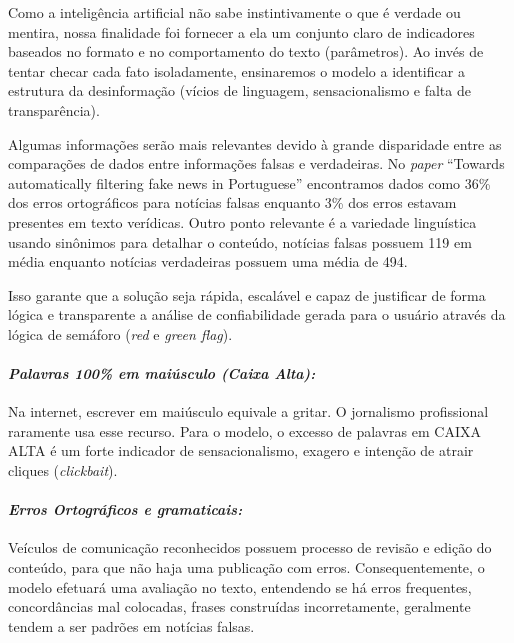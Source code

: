 \documentclass[
  brazilian,
  11pt,
]{article}
\begin{document}
Como a inteligência artificial não sabe instintivamente o que é verdade ou mentira, nossa finalidade foi fornecer a ela um conjunto claro de indicadores baseados no formato e no comportamento do texto (parâmetros). Ao invés de tentar checar cada fato isoladamente, ensinaremos o modelo a identificar a estrutura da desinformação (vícios de linguagem, sensacionalismo e falta de transparência).

Algumas informações serão mais relevantes devido à grande disparidade entre as comparações de dados entre informações falsas e verdadeiras. No \emph{paper} ``Towards automatically filtering fake news in Portuguese'' encontramos dados como 36\% dos erros ortográficos para notícias falsas enquanto 3\% dos erros estavam presentes em texto verídicas. Outro ponto relevante é a variedade linguística usando sinônimos para detalhar o conteúdo, notícias falsas possuem 119 em média enquanto notícias verdadeiras possuem uma média de 494.

Isso garante que a solução seja rápida, escalável e capaz de justificar de forma lógica e transparente a análise de confiabilidade gerada para o usuário através da lógica de semáforo (\emph{red} e \emph{green flag}).

\paragraph{\texorpdfstring{\emph{Palavras 100\% em maiúsculo (Caixa Alta):}}{Palavras 100\% em maiúsculo (Caixa Alta):}}\label{palavras-100-em-maiuxfasculo-caixa-alta}

Na internet, escrever em maiúsculo equivale a gritar. O jornalismo profissional raramente usa esse recurso. Para o modelo, o excesso de palavras em CAIXA ALTA é um forte indicador de sensacionalismo, exagero e intenção de atrair cliques (\emph{clickbait}).

\paragraph{\texorpdfstring{\emph{Erros Ortográficos e gramaticais:}}{Erros Ortográficos e gramaticais:}}\label{erros-ortogruxe1ficos-e-gramaticais}

Veículos de comunicação reconhecidos possuem processo de revisão e edição do conteúdo, para que não haja uma publicação com erros. Consequentemente, o modelo efetuará uma avaliação no texto, entendendo se há erros frequentes, concordâncias mal colocadas, frases construídas incorretamente, geralmente tendem a ser padrões em notícias falsas.
\end{document}
